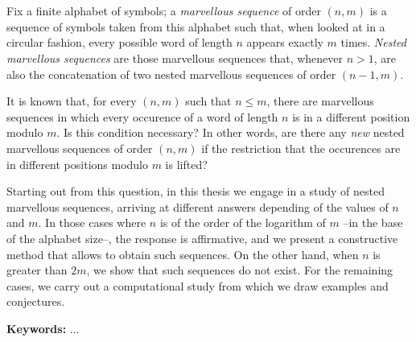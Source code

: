 \chapter*{\runtitle}

Fix a finite alphabet of symbols; a \emph{marvellous sequence} of order $(n,m)$
is a sequence of symbols taken from this alphabet such that, when looked at in
a circular fashion, every possible word of length $n$ appears exactly $m$ times.
\emph{Nested marvellous sequences} are those marvellous sequences that, whenever
$n > 1$, are also the concatenation of two nested marvellous sequences of order
$(n-1,m)$.

It is known that, for every $(n,m)$ such that $n \leq m$, there are marvellous
sequences in which every occurence of a word of length $n$ is in a different
position modulo $m$. Is this condition necessary? In other words,
are there any \emph{new} nested marvellous sequences of order $(n,m)$ if the
restriction that the occurences are in different positions modulo $m$ is lifted?

Starting out from this question, in this thesis we engage in a study of nested
marvellous sequences, arriving at different answers depending of the values of
$n$ and $m$. In those cases where $n$ is of the order of the logarithm of $m$
--in the base of the alphabet size--, the response is affirmative, and we
present a constructive method that allows to obtain such sequences. On the other
hand, when $n$ is greater than $2m$, we show that such sequences do not exist.
For the remaining cases, we carry out a computational study from which we
draw examples and conjectures.

\bigskip

\noindent\textbf{Keywords:} ...
